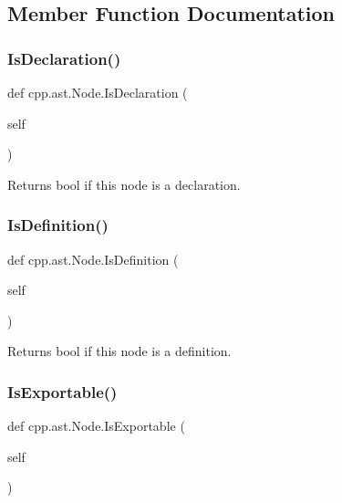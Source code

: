 \subsection{Member Function Documentation}
\mbox{\label{classcpp_1_1ast_1_1_node_ab3eca703a79fb65bc25dfbcb7547c79e}} 
\subsubsection{\texorpdfstring{Is\+Declaration()}{IsDeclaration()}}
{\footnotesize\ttfamily def cpp.\+ast.\+Node.\+Is\+Declaration (\begin{DoxyParamCaption}\item[{}]{self }\end{DoxyParamCaption})}

\begin{DoxyVerb}Returns bool if this node is a declaration.\end{DoxyVerb}
 \mbox{\label{classcpp_1_1ast_1_1_node_a684ee9a357168e7e07a24fc6812f66e6}} 
\subsubsection{\texorpdfstring{Is\+Definition()}{IsDefinition()}}
{\footnotesize\ttfamily def cpp.\+ast.\+Node.\+Is\+Definition (\begin{DoxyParamCaption}\item[{}]{self }\end{DoxyParamCaption})}

\begin{DoxyVerb}Returns bool if this node is a definition.\end{DoxyVerb}
 \mbox{\label{classcpp_1_1ast_1_1_node_a313273874ccf578485006d4000128234}} 
\subsubsection{\texorpdfstring{Is\+Exportable()}{IsExportable()}}
{\footnotesize\ttfamily def cpp.\+ast.\+Node.\+Is\+Exportable (\begin{DoxyParamCaption}\item[{}]{self }\end{DoxyParamCaption})}

